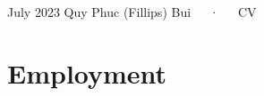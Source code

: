 \documentclass[11pt,a4paper,]{awesome-cv}
\begin{document}
\makecvheader

\makecvfooter
  {July 2023}
    {Quy Phuc (Fillips) Bui~~~·~~~CV}
  {\thepage}





\hypertarget{employment}{%
\section{Employment}\label{employment}}
\end{document}
